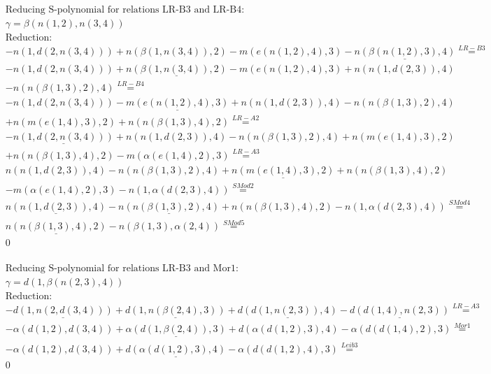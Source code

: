 \documentclass[11pt]{amsart}
\begin{document}
\begin{align*} 
& \text{Reducing S-polynomial for relations LR-B3 and LR-B4:} \\ 
& \gamma = \beta(n(1,2),n(3,4)) \\ 
& \text{Reduction}: \\& - n(1,d(2,n(3,4))) + n(\beta(1,n(3,4)),2) - m(e(n(1,2),4),3) - \underline{n(\beta(n(1,2),3),4)} \stackrel{ LR-B3 }{=}  \\ 
& - n(1,d(2,n(3,4))) + \underline{n(\beta(1,n(3,4)),2)} - m(e(n(1,2),4),3) + n(n(1,d(2,3)),4)\\ 
 &  - n(n(\beta(1,3),2),4) \stackrel{ LR-B4 }{=}  \\ 
& - n(1,d(2,n(3,4))) - \underline{m(e(n(1,2),4),3)} + n(n(1,d(2,3)),4) - n(n(\beta(1,3),2),4)\\ 
 &  + n(m(e(1,4),3),2) + n(n(\beta(1,3),4),2) \stackrel{ LR-A2 }{=}  \\ 
& - \underline{n(1,d(2,n(3,4)))} + n(n(1,d(2,3)),4) - n(n(\beta(1,3),2),4) + n(m(e(1,4),3),2)\\ 
 &  + n(n(\beta(1,3),4),2) - m(\alpha(e(1,4),2),3) \stackrel{ LR-A3 }{=}  \\ 
&n(n(1,d(2,3)),4) - n(n(\beta(1,3),2),4) + \underline{n(m(e(1,4),3),2)} + n(n(\beta(1,3),4),2)\\ 
 &  - m(\alpha(e(1,4),2),3) - n(1,\alpha(d(2,3),4)) \stackrel{ SMod2 }{=}  \\ 
&\underline{n(n(1,d(2,3)),4)} - \underline{n(n(\beta(1,3),2),4)} + n(n(\beta(1,3),4),2) - n(1,\alpha(d(2,3),4)) \stackrel{ SMod4 }{=}  \\ 
&\underline{n(n(\beta(1,3),4),2)} - n(\beta(1,3),\alpha(2,4)) \stackrel{ SMod5 }{=}  \\ 
&0\\ 
\end{align*} 
 
\begin{align*} 
& \text{Reducing S-polynomial for relations LR-B3 and Mor1:} \\ 
& \gamma = d(1,\beta(n(2,3),4)) \\ 
& \text{Reduction}: \\& - \underline{d(1,n(2,d(3,4)))} + \underline{d(1,n(\beta(2,4),3))} + \underline{d(d(1,n(2,3)),4)} - \underline{d(d(1,4),n(2,3))} \stackrel{ LR-A3 }{=}  \\ 
& - \alpha(d(1,2),d(3,4)) + \underline{\alpha(d(1,\beta(2,4)),3)} + d(\alpha(d(1,2),3),4) - \alpha(d(d(1,4),2),3) \stackrel{ Mor1 }{=}  \\ 
& - \alpha(d(1,2),d(3,4)) + \underline{d(\alpha(d(1,2),3),4)} - \alpha(d(d(1,2),4),3) \stackrel{ Leib3 }{=}  \\ 
&0\\ 
\end{align*} 
 
\end{document}
